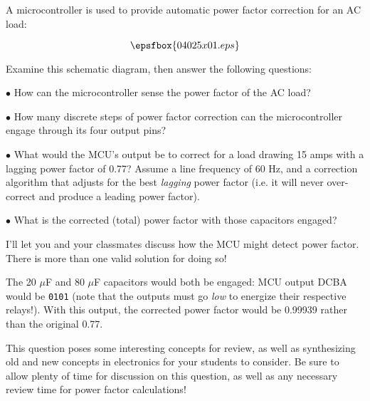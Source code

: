 

A microcontroller is used to provide automatic power factor correction for an AC load:

$$\epsfbox{04025x01.eps}$$

Examine this schematic diagram, then answer the following questions:

\medskip
\goodbreak
\item{$\bullet$} How can the microcontroller sense the power factor of the AC load?
\item{$\bullet$} How many discrete steps of power factor correction can the microcontroller engage through its four output pins?
\item{$\bullet$} What would the MCU's output be to correct for a load drawing 15 amps with a lagging power factor of 0.77?  Assume a line frequency of 60 Hz, and a correction algorithm that adjusts for the best {\it lagging} power factor (i.e. it will never over-correct and produce a leading power factor).
\item{$\bullet$} What is the corrected (total) power factor with those capacitors engaged?
\medskip







I'll let you and your classmates discuss how the MCU might detect power factor.  There is more than one valid solution for doing so!

The 20 $\mu$F and 80 $\mu$F capacitors would both be engaged: MCU output DCBA would be {\tt 0101} (note that the outputs must go {\it low} to energize their respective relays!).  With this output, the corrected power factor would be 0.99939 rather than the original 0.77.







This question poses some interesting concepts for review, as well as synthesizing old and new concepts in electronics for your students to consider.  Be sure to allow plenty of time for discussion on this question, as well as any necessary review time for power factor calculations!




